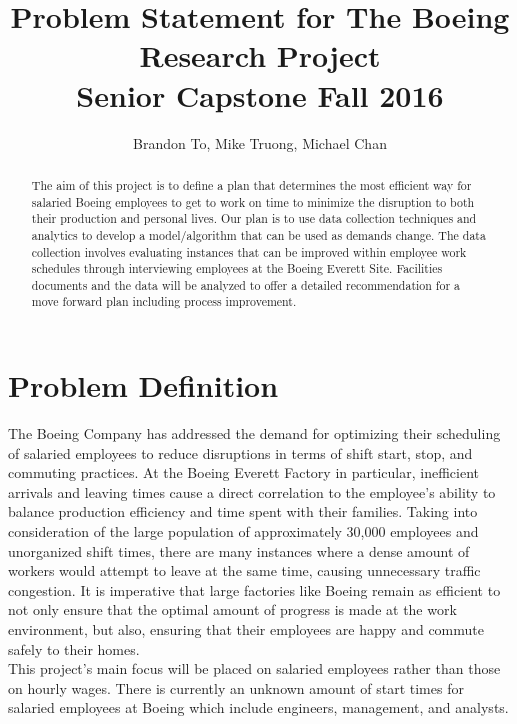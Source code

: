 \documentclass[journal, 11pt, letterpaper]{IEEEtran}
\title{Problem Statement for The Boeing Research Project\\ \huge{Senior Capstone{} \hspace*{3cm} Fall 2016}}
\author{Brandon To, Mike Truong, Michael Chan}
\newcommand\tab[1][1cm]{\hspace*{#1}}
\begin{document}
\clearpage\maketitle
\thispagestyle{empty}

\begin{abstract}
\tab The aim of this project is to define a plan that determines the most efficient way for salaried Boeing employees to get to work on time to minimize the disruption to both their production and personal lives.
Our plan is to use data collection techniques and analytics to develop a model/algorithm that can be used as demands change.
The data collection involves evaluating instances that can be improved within employee work schedules through interviewing employees at the Boeing Everett Site.
Facilities documents and the data will be analyzed to offer a detailed recommendation for a move forward plan including process improvement.
\end{abstract}

\newpage
\clearpage
\thispagestyle{empty}
\tableofcontents
\newpage

\setcounter{page}{1}


\section{Problem Definition}
\tab The Boeing Company has addressed the demand for optimizing their scheduling of salaried employees to reduce disruptions in terms of shift start, stop, and commuting practices. 
At the Boeing Everett Factory in particular, inefficient arrivals and leaving times cause a direct correlation to the employee’s ability to balance production efficiency and time spent with their families.
Taking into consideration of the large population of approximately 30,000 employees and unorganized shift times, there are many instances where a dense amount of workers would attempt to leave at the same time, causing unnecessary traffic congestion.
It is imperative that large factories like Boeing remain as efficient to not only ensure that the optimal amount of progress is made at the work environment, but also, ensuring that their employees are happy and commute safely to their homes.\\
\tab This project’s main focus will be placed on salaried employees rather than those on hourly wages. 
There is currently an unknown amount of start times for salaried employees at Boeing which include engineers, management, and analysts. 
\end{document}
